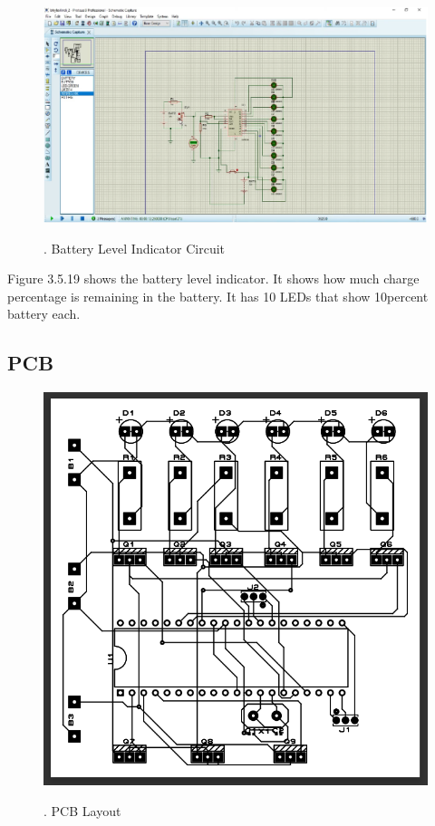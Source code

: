 \documentclass[a4paper,12pt]{article}
\begin{document}
\newpage
\begin{figure}[!h]
\centering
\includegraphics[scale=0.5]{bli.png}\\
\caption{. Battery Level Indicator Circuit}
\end{figure}
Figure 3.5.19 shows the battery level indicator. It shows how much charge percentage is remaining in the battery. It has 10 LEDs that show 10percent battery each.\\

\newpage
\subsection{PCB}

\begin{figure}[!h]
\centering
\includegraphics[scale=0.5]{pcbl.png}\\
\caption{. PCB Layout}
\end{figure}
\end{document}
